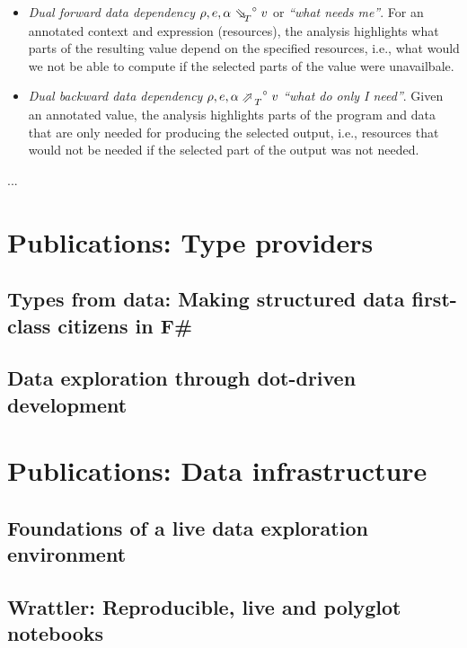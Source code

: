 \documentclass[fleqn,11pt]{report}
\theoremstyle{definition}
\newenvironment{nitemize}
{ \vspace{-0.4em}
  \begin{itemize}
    \setlength{\itemsep}{5pt}
    \setlength{\parskip}{0pt}
    \setlength{\parsep}{0pt} }
{ \end{itemize}
  \vspace{-0.4em} }
\begin{document}
\begin{nitemize}
\item \emph{Dual forward data dependency} $\rho, e, \alpha\; \dual{\evalFwdR{T}}\; v$ or \emph{``what needs me''}.
  For an annotated context and expression (resources), the analysis highlights what
  parts of the resulting value depend on the specified resources, i.e., what would we not be
  able to compute if the selected parts of the value were unavailbale.
\item \emph{Dual backward data dependency} $\rho, e, \alpha\; \dual{\evalBwdR{T}}\; v$ \emph{``what do only I need''}.
  Given an annotated value, the analysis highlights parts of the program and data
  that are only needed for producing the selected output, i.e., resources that
  would not be needed if the selected part of the output was not needed.
\end{nitemize}

...

\part{Publications: Type providers}
\label{part:providers}

\chapter{Types from data: Making structured data first-class citizens in F\#}
\label{ch:fsdata}

\chapter{Data exploration through dot-driven development}
\label{ch:dotdriven}

\part{Publications: Data infrastructure}
\label{part:infra}

\chapter{Foundations of a live data exploration environment}
\label{ch:foundations}

\chapter{Wrattler: Reproducible, live and polyglot notebooks}
\label{ch:wrattler}
\end{document}
